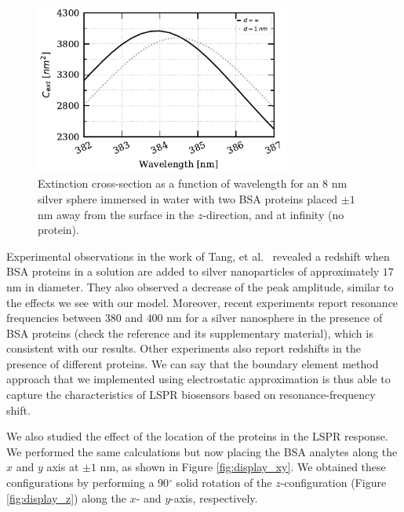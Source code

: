 \begin{figure}[h] %
    \centering
    \includegraphics[width=0.75\textwidth]{2pz_R8nm.pdf} 
    \caption{Extinction cross-section as a function of wavelength for an $8$ nm
             silver sphere immersed in water with two BSA proteins placed 
             $\pm 1$ nm away from the surface in the $z$-direction, and at
             infinity (no protein).}
    \label{fig:2pz_response}
 \end{figure}

Experimental observations in the work of Tang, et al.~\cite{TangETal2010} revealed a redshift when 
BSA proteins in a solution are added to silver nanoparticles of approximately $17$ nm 
in diameter. They also observed a decrease of the peak amplitude, similar to the 
effects we see with our model. Moreover, recent experiments \cite{PuETal2018} report 
resonance frequencies between $380$ and $400$ nm for a silver nanosphere in the presence
of BSA proteins (check the reference and its supplementary material), which is consistent with 
our results. Other experiments \cite{RaphaelETal2013} also report redshifts in the presence
of different proteins. We can say that the boundary element method approach that we implemented using 
electrostatic approximation is thus able to capture the characteristics of LSPR biosensors
based on resonance-frequency shift. 

We also studied the effect of the location of the proteins in the LSPR response. We performed 
the same calculations but now placing the BSA analytes along the $x$ and $y$ axis at $\pm 1$ nm,
as shown in Figure \ref{fig:display_xy}. We obtained these configurations by performing
a 90$^\circ$ solid rotation of the $z$-configuration (Figure \ref{fig:display_z}) along the $x$- and $y$-axis, respectively. 

